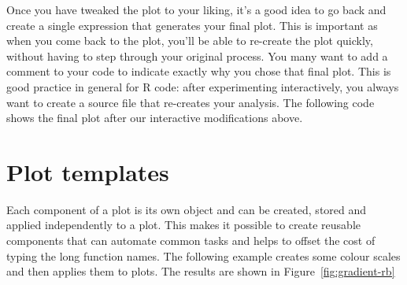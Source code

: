 % 


Once you have tweaked the plot to your liking, it's a good idea to go back and create a single expression that generates your final plot. This is important as when you come back to the plot, you'll be able to re-create the plot quickly, without having to step through your original process. You many want to add a comment to your code to indicate exactly why you chose that final plot. This is good practice in general for R code: after experimenting interactively, you always want to create a source file that re-creates your analysis.  The following code shows the final plot after our interactive modifications above.

% 


\section{Plot templates}
\label{sec:templates}

Each component of a \ggplot plot is its own object and can be created, stored and applied independently to a plot. This makes it possible to create reusable components that can automate common tasks and helps to offset the cost of typing the long function names. The following example creates some colour scales and then applies them to plots. The results are shown in Figure~\ref{fig:gradient-rb}

% 


